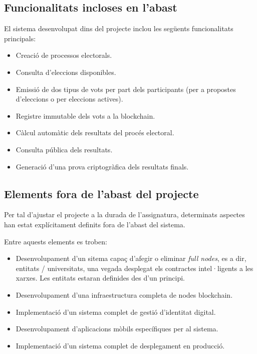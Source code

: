 \documentclass[12pt,a4paper]{article}
\begin{document}
\subsection{Funcionalitats incloses en l'abast}

El sistema desenvolupat dins del projecte inclou les següents funcionalitats principals:

\begin{itemize}

\item Creació de processos electorals.
\item Consulta d'eleccions disponibles.
\item Emissió de dos tipus de vots per part dels participants (per a propostes d'eleccions o per eleccions actives).
\item Registre immutable dels vots a la blockchain.
\item Càlcul automàtic dels resultats del procés electoral.
\item Consulta pública dels resultats.
\item Generació d'una prova criptogràfica dels resultats finals.

\end{itemize}

\subsection{Elements fora de l'abast del projecte}

Per tal d'ajustar el projecte a la durada de l'assignatura, determinats aspectes han estat explícitament definits fora de l'abast del sistema.

Entre aquests elements es troben:

\begin{itemize}

\item Desenvolupament d'un sitema capaç d'afegir o eliminar \textit{full nodes}, es a dir, entitats / universitats, una vegada desplegat els contractes intel·ligents a les xarxes. Les entitats estaran definides des d'un principi.
\item Desenvolupament d'una infraestructura completa de nodes blockchain.
\item Implementació d'un sistema complet de gestió d'identitat digital.
\item Desenvolupament d'aplicacions mòbils específiques per al sistema.
\item Implementació d'un sistema complet de desplegament en producció.

\end{itemize}
\end{document}
